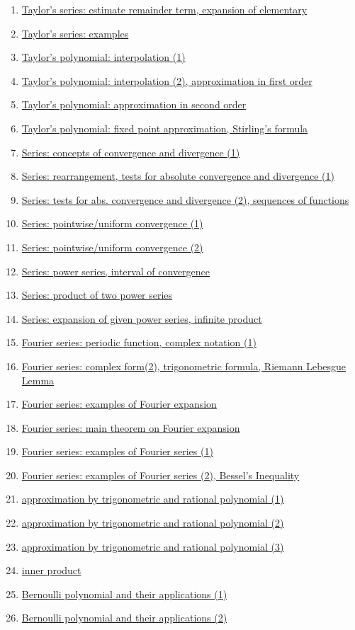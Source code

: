 \documentclass[11pt]{article}
\begin{document}
\begin{enumerate}
	\item \href{URL}{Taylor's series: estimate remainder term, expansion of elementary}	%
	\item \href{URL}{Taylor's series: examples}	%
	\item \href{URL}{Taylor's polynomial: interpolation (1)}	%
	\item \href{URL}{Taylor's polynomial: interpolation (2), approximation in first order}	%
	\item \href{URL}{Taylor's polynomial: approximation in second order}	%
	\item \href{URL}{Taylor's polynomial: fixed point approximation, Stirling's formula}	%
	\item \href{URL}{Series: concepts of convergence and divergence (1)}	%
	\item \href{URL}{Series: rearrangement, tests for absolute convergence and divergence (1)}	%
	\item \href{URL}{Series: tests for abs. convergence and divergence (2), sequences of functions}	%
	\item \href{URL}{Series: pointwise/uniform convergence (1)}	%
	\item \href{URL}{Series: pointwise/uniform convergence (2)}	%
	\item \href{URL}{Series: power series, interval of convergence}	%
	\item \href{URL}{Series: product of two power series}	%
	\item \href{URL}{Series: expansion of given power series, infinite product}	%
	\item \href{URL}{Fourier series: periodic function, complex notation (1)}	%
	\item \href{URL}{Fourier series: complex form(2), trigonometric formula, Riemann Lebesgue Lemma}	%
	\item \href{URL}{Fourier series: examples of Fourier expansion}	%
	\item \href{URL}{Fourier series: main theorem on Fourier expansion}	%
	\item \href{URL}{Fourier series: examples of Fourier series (1)}	%
	\item \href{URL}{Fourier series: examples of Fourier series (2), Bessel's Inequality}	%
	\item \href{URL}{approximation by trigonometric and rational polynomial (1)}	%
	\item \href{URL}{approximation by trigonometric and rational polynomial (2)}	%
	\item \href{URL}{approximation by trigonometric and rational polynomial (3)}	%
	\item \href{URL}{inner product}	%
	\item \href{URL}{Bernoulli polynomial and their applications (1)}	%
	\item \href{URL}{Bernoulli polynomial and their applications (2)}	%
\end{enumerate}
\end{document}
